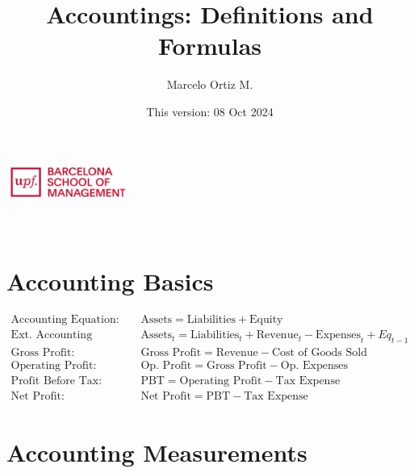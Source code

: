 \documentclass[12pt]{article}
\title{Accountings: Definitions and  Formulas}
\author{Marcelo Ortiz M.}
\date{This version: 08 Oct 2024}
\begin{document}
\makeatletter  
\begin{center}
	\includegraphics[width=0.3\textwidth]{logo.png}\\[1em]  %
	{\LARGE \textbf{\@title}}\\[1em]  %
	{\large \@author}\\[1em]  %
	{\@date}  %
\end{center}
\makeatother  %

\section{Accounting Basics}
	\begin{tcolorbox}
	\begin{align*}
		\text{Accounting Equation:} \quad & \text{Assets} = \text{Liabilities} + \text{Equity} \\
		\text{Ext. Accounting Equation:} \quad & \text{Assets}_{t} = \text{Liabilities}_{t} + \text{Revenue}_{t}- \text{Expenses}_t+Eq_{t-1} \\
		\text{Gross Profit:} \quad & \text{Gross Profit} = \text{Revenue} - \text{Cost of Goods Sold} \\
		\text{Operating Profit:} \quad & \text{Op. Profit} = \text{Gross Profit} - \text{Op. Expenses} \\
		\text{Profit Before Tax:} \quad & \text{PBT} = \text{Operating Profit} - \text{Tax Expense} \\
		\text{Net Profit:} \quad & \text{Net Profit} = \text{PBT} - \text{Tax Expense}
	\end{align*}
	\end{tcolorbox}

\section{Accounting Measurements}
\end{document}
